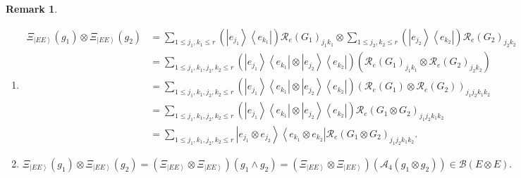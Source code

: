 \documentclass[aps,preprint]{revtex4}%
\newtheorem{remark}[theorem]{Remark}
\begin{document}
\begin{remark}
\begin{enumerate}
\item
\begin{align}
\Xi_{\left\vert EE\right\rangle }\left(  g_{1}\right)  \otimes\Xi_{\left\vert
EE\right\rangle }\left(  g_{2}\right)   &  =\sum_{1\leq j_{1},k_{1}\leq
r}\left(  \left\vert \overset{}{e_{j_{1}}}\right\rangle \left\langle
\overset{}{e_{k_{1}}}\right\vert \right)  \mathcal{R}_{e}\left(  G_{1}\right)
_{j_{1}k_{1}}\otimes\sum_{1\leq j_{2},k_{2}\leq r}\left(  \left\vert
\overset{}{e_{j_{2}}}\right\rangle \left\langle \overset{}{e_{k_{2}}%
}\right\vert \right)  \mathcal{R}_{e}\left(  G_{2}\right)  _{j_{2}k_{2}}\\
&  =\sum_{1\leq j_{1},k_{1},j_{2},k_{2}\leq r}\left(  \left\vert
\overset{}{e_{j_{1}}}\right\rangle \left\langle \overset{}{e_{k_{1}}%
}\right\vert \otimes\left\vert \overset{}{e_{j_{2}}}\right\rangle \left\langle
\overset{}{e_{k_{2}}}\right\vert \right)  \left(  \mathcal{R}_{e}\left(
G_{1}\right)  _{j_{1}k_{1}}\otimes\mathcal{R}_{e}\left(  G_{2}\right)
_{j_{2}k_{2}}\right) \\
&  =\sum_{1\leq j_{1},k_{1},j_{2},k_{2}\leq r}\left(  \left\vert
\overset{}{e_{j_{1}}}\right\rangle \left\langle \overset{}{e_{k_{1}}%
}\right\vert \otimes\left\vert \overset{}{e_{j_{2}}}\right\rangle \left\langle
\overset{}{e_{k_{2}}}\right\vert \right)  \left(  \mathcal{R}_{e}\left(
G_{1}\right)  \otimes\mathcal{R}_{e}\left(  G_{2}\right)  \right)
_{j_{1}j_{2}k_{1}k_{2}}\\
&  =\sum_{1\leq j_{1},k_{1},j_{2},k_{2}\leq r}\left(  \left\vert
\overset{}{e_{j_{1}}}\right\rangle \left\langle \overset{}{e_{k_{1}}%
}\right\vert \otimes\left\vert \overset{}{e_{j_{2}}}\right\rangle \left\langle
\overset{}{e_{k_{2}}}\right\vert \right)  \mathcal{R}_{e}\left(  G_{1}\otimes
G_{2}\right)  _{j_{1}j_{2}k_{1}k_{2}}\\
&  =\sum_{1\leq j_{1},k_{1},j_{2},k_{2}\leq r}\left\vert \overset{}{e_{j_{1}}%
}\otimes e_{j_{2}}\right\rangle \left\langle \overset{}{e_{k_{1}}}\otimes
e_{k_{2}}\right\vert \mathcal{R}_{e}\left(  G_{1}\otimes G_{2}\right)
_{j_{1}j_{2}k_{1}k_{2}}.
\end{align}


\item
\begin{equation}
\Xi_{\left\vert EE\right\rangle }\left(  g_{1}\right)  \otimes\Xi_{\left\vert
EE\right\rangle }\left(  g_{2}\right)  =\left(  \Xi_{\left\vert
EE\right\rangle }\otimes\Xi_{\left\vert EE\right\rangle }\right)  \left(
g_{1}\wedge g_{2}\right)  =\left(  \Xi_{\left\vert EE\right\rangle }\otimes
\Xi_{\left\vert EE\right\rangle }\right)  \left(  \mathcal{A}_{4}\left(
g_{1}\otimes g_{2}\right)  \right)  \in\mathcal{B}\left(  E\otimes E\right)  .
\end{equation}



\end{enumerate}
\end{remark}
\end{document}
